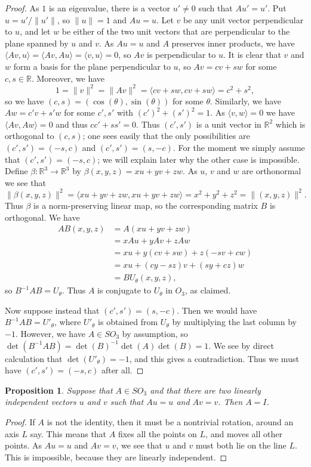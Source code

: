 \documentclass{amsart}
\newcommand{\R}         {{\mathbb{R}}}
\newcommand{\ip}[1]     {\langle #1\rangle}
\newcommand{\xra}       {\xrightarrow}
\newcommand{\bt}        {\beta}
\renewcommand{\:}{\colon}
\newtheorem{proposition}[theorem]{Proposition}
\theoremstyle{definition}
\begin{document}
\begin{proof}
 As $1$ is an eigenvalue, there is a vector $u'\neq 0$ such that
 $Au'=u'$.  Put $u=u'/\|u'\|$, so $\|u\|=1$ and $Au=u$.  Let $v$ be
 any unit vector perpendicular to $u$, and let $w$ be either of the
 two unit vectors that are perpendicular to the plane spanned by $u$
 and $v$.  As $Au=u$ and $A$ preserves inner products, we have
 $\ip{Av,u}=\ip{Av,Au}=\ip{v,u}=0$, so $Av$ is perpendicular to $u$.
 It is clear that $v$ and $w$ form a basis for the plane perpendicular
 to $u$, so $Av=cv+sw$ for some $c,s\in\R$.  Moreover, we have
 \[ 1 = \|v\|^2 = \|Av\|^2 = \ip{cv+sw,cv+sw}=c^2+s^2, \]
 so we have $(c,s)=(\cos(\theta),\sin(\theta))$ for some $\theta$.
 Similarly, we have $Aw=c'v+s'w$ for some $c',s'$ with
 $(c')^2+(s')^2=1$.  As $\ip{v,w}=0$ we have $\ip{Av,Aw}=0$ and thus
 $cc'+ss'=0$.  Thus $(c',s')$ is a unit vector in $\R^2$ which is
 orthogonal to $(c,s)$; one sees easily that the only possibilities
 are $(c',s')=(-s,c)$ and $(c',s')=(s,-c)$.  For the moment we simply
 assume that $(c',s')=(-s,c)$; we will explain later why the other
 case is impossible.  Define $\bt\:\R^3\xra{}\R^3$ by
 $\bt(x,y,z)=xu+yv+zw$.  As $u$, $v$ and $w$ are orthonormal we see
 that
 \[ \|\bt(x,y,z)\|^2=\ip{xu+yv+zw,xu+yv+zw}=
     x^2+y^2+z^2=\|(x,y,z)\|^2.
 \]
 Thus $\bt$ is a norm-preserving linear map, so the corresponding
 matrix $B$ is orthogonal.  We have
 \begin{align*}
  AB(x,y,z) &= A(xu+yv+zw) \\
            &= xAu+yAv+zAw \\
            &= xu + y(cv+sw) + z (-sv+cw) \\
            &= xu + (cy-sz)v + (sy+cz)w \\
            &= BU_\theta(x,y,z),
 \end{align*}
 so $B^{-1}AB=U_\theta$.  Thus $A$ is conjugate to $U_\theta$ in $O_3$, as
 claimed.

 Now suppose instead that $(c',s')=(s,-c)$.  Then we would have
 $B^{-1}AB=U'_\theta$, where $U'_\theta$ is obtained from $U_\theta$ by
 multiplying the last column by $-1$.  However, we have $A\in SO_3$ by
 assumption, so $\det(B^{-1}AB)=\det(B)^{-1}\det(A)\det(B)=1$.  We see
 by direct calculation that $\det(U'_\theta)=-1$, and this gives a
 contradiction.  Thus we must have $(c',s')=(-s,c)$ after all.
\end{proof}

\begin{proposition}\label{prop-rot-fix}
 Suppose that $A\in SO_3$ and that there are two linearly independent
 vectors $u$ and $v$ such that $Au=u$ and $Av=v$.  Then $A=I$.
\end{proposition}
\begin{proof}
 If $A$ is not the identity, then it must be a nontrivial rotation,
 around an axis $L$ say.  This means that $A$ fixes all the points on
 $L$, and moves all other points.  As $Au=u$ and $Av=v$, we see that
 $u$ and $v$ must both lie on the line $L$.  This is impossible,
 because they are linearly independent. 
\end{proof}
\end{document}
